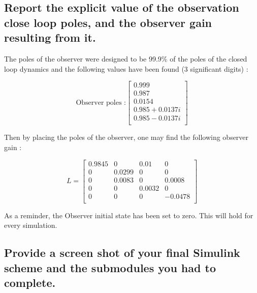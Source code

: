 \subsection{Report the explicit value of the observation close loop poles, and the observer gain resulting
from it.}
The poles of the observer were designed to be 99.9\% of the poles of the closed loop dynamics and the following values have been found (3 significant digits) :

\begin{equation}
    \text{Observer poles :}
    \left[\begin{array}{c}
         0.999\\
         0.987\\
         0.0154\\
         0.985 + 0.0137i\\
         0.985 - 0.0137i\\
    \end{array}
    \right]
\end{equation}

Then by placing the poles of the observer, one may find the following observer gain :

\begin{equation}
    L = 
    \left[ {\begin{array}{ccccc}
        0.9845 &0      &0.01   &0         \\
        0      &0.0299 &0      &0         \\
        0      &0.0083 &0      &0.0008    \\
        0      &0      &0.0032 &0         \\
        0      &0      &0      &-0.0478   \\
    \end{array} } \right] 
\end{equation}

As a reminder, the Observer initial state has been set to zero. This will hold for every simulation.

\subsection{Provide a screen shot of your final Simulink scheme and the submodules you had to complete.}

